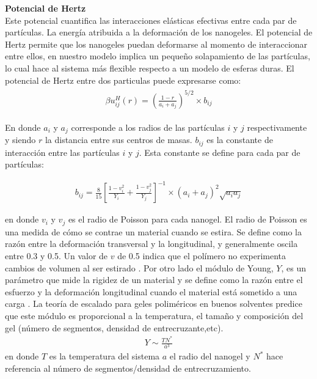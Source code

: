 	\textbf{Potencial de Hertz} \\
	
	Este  potencial  cuantifica las interacciones el\'asticas efectivas entre cada par de part\'iculas. La energ\'ia atribuida a la deformaci\'on de los nanogeles.  El potencial de Hertz permite que los nanogeles puedan deformarse al momento de interaccionar entre ellos, en nuestro modelo implica un peque\~no solapamiento de las part\'iculas, lo cual hace al sistema m\'as flexible respecto a un modelo de esferas duras. 
	El potencial de Hertz entre dos particulas puede expresarse como:
	\begin{align}
		\begin{aligned}
			\beta u^H_{ij} (r) = \left(\frac{1-r}{a_i + a_j}\right)^{5/2}\times b_{ij}
		\end{aligned}
		\label{eq:mc:hertz_ij}
	\end{align}
	
	\noindent En donde $a_i$ y $a_j$ corresponde a los radios de las part\'iculas $i$ y $j$ respectivamente y siendo $r$ la distancia entre sus centros de masas. $b_{ij}$ es la constante de interacci\'on entre las part\'iculas $i$ y $j$. Esta constante se define para cada par de part\'iculas:
	
	\begin{align}
		b_{ij} = \frac{8}{15}\left[\frac{1-v_i^2}{Y_i} + \frac{1-v_j^2}{Y_j}  \right]^{-1} \times(a_i +a_j)^2 \sqrt{a_ia_j}
		\label{eq:mc:bij_param}
	\end{align}
	
	\noindent en donde $v_i$ y $v_j$ es el radio de Poisson para cada nanogel.
	El radio de Poisson es una medida de c\'omo se contrae un material cuando se estira. Se define como la raz\'on entre la deformaci\'on transversal y la longitudinal, y generalmente oscila entre 0.3 y 0.5. Un valor de $v$ de 0.5 indica que el pol\'imero no experimenta cambios de volumen al ser estirado \cite{bertoldi2010negative}.
	Por otro lado el m\'odulo de  Young, $Y$,  es un par\'ametro  que mide la rigidez de un material y se define como la raz\'on entre el esfuerzo y la deformaci\'on longitudinal cuando el material est\'a sometido a una carga \cite{ku2011review}.
	La teor\'ia de escalado para geles polim\'ericos en buenos solventes \cite{de1979scaling,hu2012polymer} predice que este m\'odulo es proporcional a la temperatura, el tama\~no y composici\'on del gel (n\'umero de segmentos, densidad de entrecruzante,etc).
	\begin{align}
		Y \sim \frac{TN^*}{a^3}
	\end{align}
	\noindent en donde $T$ es la temperatura del sistema $a$ el radio del nanogel y $N^*$ hace referencia al n\'umero de segmentos/densidad de entrecruzamiento. \\
	
